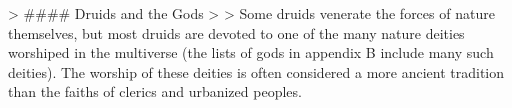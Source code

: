 > #### Druids and the Gods
>
> Some druids venerate the forces of nature themselves, but most druids are devoted to one of the many nature deities worshiped in the multiverse (the lists of gods in appendix B include many such deities). The worship of these deities is often considered a more ancient tradition than the faiths of clerics and urbanized peoples.